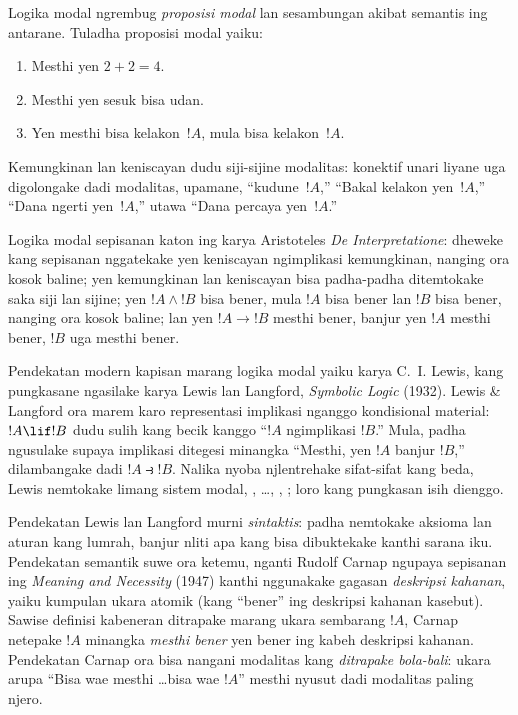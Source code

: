 \documentclass[../../../include/open-logic-section]{subfiles}
\begin{document}


Logika modal ngrembug \emph{proposisi modal} lan sesambungan akibat semantis
ing antarane. Tuladha proposisi modal yaiku:
\begin{enumerate}
\item Mesthi yen $2+2=4$.
\item Mesthi yen sesuk bisa udan.
\item Yen mesthi bisa kelakon~$!A$, mula bisa kelakon~$!A$.
\end{enumerate}
Kemungkinan lan keniscayan dudu siji-sijine modalitas: konektif
unari liyane uga digolongake dadi modalitas, upamane, ``kudune~$!A$,''
``Bakal kelakon yen~$!A$,'' ``Dana ngerti yen~$!A$,''
utawa ``Dana percaya yen~$!A$.''

Logika modal sepisanan katon ing karya Aristoteles \emph{De
  Interpretatione}: dheweke kang sepisanan nggatekake yen keniscayan
ngimplikasi kemungkinan, nanging ora kosok baline; yen kemungkinan
lan keniscayan bisa padha-padha ditemtokake saka siji lan sijine;
yen $!A \land !B$ bisa bener, mula $!A$ bisa bener lan $!B$
bisa bener, nanging ora kosok baline; lan yen $!A \to !B$
mesthi bener, banjur yen $!A$ mesthi bener, $!B$ uga mesthi bener.

Pendekatan modern kapisan marang logika modal yaiku karya
C.~I. Lewis, kang pungkasane ngasilake karya Lewis lan Langford,
\emph{Symbolic Logic} (1932). Lewis \& Langford ora marem karo
representasi implikasi nganggo kondisional material: $!A \lif !B$
dudu sulih kang becik kanggo ``$!A$ ngimplikasi $!B$.'' Mula,
padha ngusulake supaya implikasi ditegesi minangka ``Mesthi, yen $!A$
banjur $!B$,'' dilambangake dadi $!A \strictif !B$. Nalika nyoba
njlentrehake sifat-sifat kang beda, Lewis nemtokake limang sistem
modal, , \ldots, , ; loro kang pungkasan
isih dienggo.

Pendekatan Lewis lan Langford murni \emph{sintaktis}: padha
nemtokake aksioma lan aturan kang lumrah, banjur nliti apa kang bisa
dibuktekake kanthi sarana iku. Pendekatan semantik suwe ora ketemu,
nganti Rudolf Carnap ngupaya sepisanan ing \emph{Meaning and Necessity}
(1947) kanthi nggunakake gagasan \emph{deskripsi kahanan}, yaiku
kumpulan ukara atomik (kang ``bener'' ing deskripsi kahanan kasebut).
Sawise definisi kabeneran ditrapake marang ukara sembarang $!A$,
Carnap netepake $!A$ minangka \emph{mesthi bener} yen bener ing
kabeh deskripsi kahanan. Pendekatan Carnap ora bisa nangani modalitas kang
\emph{ditrapake bola-bali}: ukara arupa ``Bisa wae mesthi \ldots bisa wae
$!A$'' mesthi nyusut dadi modalitas paling njero.
\end{document}
